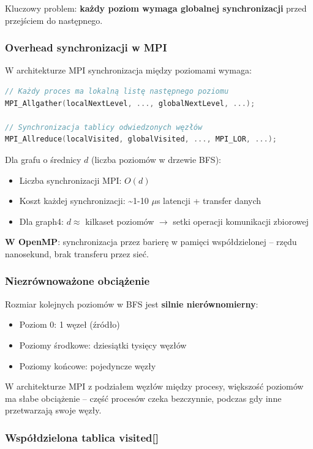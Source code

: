 Kluczowy problem: \textbf{każdy poziom wymaga globalnej synchronizacji} przed przejściem do następnego.

\subsubsection{Overhead synchronizacji w MPI}

W architekturze MPI synchronizacja między poziomami wymaga:

\begin{lstlisting}[language=C]
// Każdy proces ma lokalną listę następnego poziomu
MPI_Allgather(localNextLevel, ..., globalNextLevel, ...);

// Synchronizacja tablicy odwiedzonych węzłów
MPI_Allreduce(localVisited, globalVisited, ..., MPI_LOR, ...);
\end{lstlisting}

Dla grafu o średnicy $d$ (liczba poziomów w drzewie BFS):
\begin{itemize}
    \item Liczba synchronizacji MPI: $O(d)$
    \item Koszt każdej synchronizacji: \textasciitilde{}1-10 $\mu$s latencji + transfer danych
    \item Dla graph4: $d \approx$ kilkaset poziomów $\rightarrow$ setki operacji komunikacji zbiorowej
\end{itemize}

\textbf{W OpenMP}: synchronizacja przez barierę w pamięci współdzielonej -- rzędu nanosekund, brak transferu przez sieć.

\subsubsection{Niezrównoważone obciążenie}

Rozmiar kolejnych poziomów w BFS jest \textbf{silnie nierównomierny}:
\begin{itemize}
    \item Poziom 0: 1 węzeł (źródło)
    \item Poziomy środkowe: dziesiątki tysięcy węzłów
    \item Poziomy końcowe: pojedyncze węzły
\end{itemize}

W architekturze MPI z podziałem węzłów między procesy, większość poziomów ma słabe obciążenie -- część procesów czeka bezczynnie, podczas gdy inne przetwarzają swoje węzły.

\subsubsection{Współdzielona tablica visited[]}

